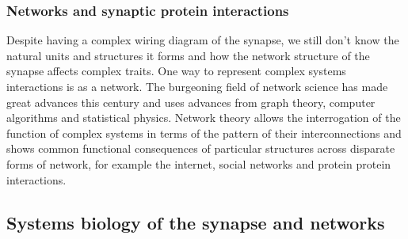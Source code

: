\subsubsection{Networks and synaptic protein interactions}
Despite having a complex wiring diagram of the synapse, we still don’t know the natural units and structures it forms and how the network structure of the synapse affects complex traits. One way to represent complex systems interactions is as a network. The burgeoning field of network science has made great advances this century and uses advances from graph theory, computer algorithms and statistical physics. Network theory allows the interrogation of the function of complex systems in terms of the pattern of their interconnections and shows common functional consequences of particular structures across disparate forms of network, for example the internet, social networks and protein protein interactions.

\subsection{Systems biology of the synapse and networks}
\label{sec:networks_intro}

